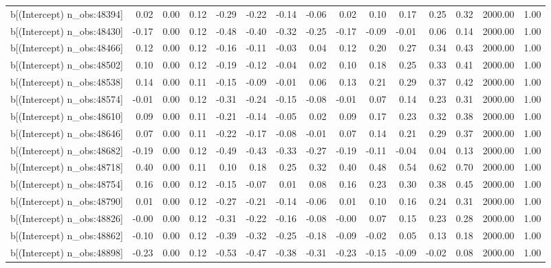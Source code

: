 \begin{table}[ht]
\begin{tabular}{rrrrrrrrrrrrrrr}
  b[(Intercept) n\_obs:48394] & 0.02 & 0.00 & 0.12 & -0.29 & -0.22 & -0.14 & -0.06 & 0.02 & 0.10 & 0.17 & 0.25 & 0.32 & 2000.00 & 1.00 \\ 
  b[(Intercept) n\_obs:48430] & -0.17 & 0.00 & 0.12 & -0.48 & -0.40 & -0.32 & -0.25 & -0.17 & -0.09 & -0.01 & 0.06 & 0.14 & 2000.00 & 1.00 \\ 
  b[(Intercept) n\_obs:48466] & 0.12 & 0.00 & 0.12 & -0.16 & -0.11 & -0.03 & 0.04 & 0.12 & 0.20 & 0.27 & 0.34 & 0.43 & 2000.00 & 1.00 \\ 
  b[(Intercept) n\_obs:48502] & 0.10 & 0.00 & 0.12 & -0.19 & -0.12 & -0.04 & 0.02 & 0.10 & 0.18 & 0.25 & 0.33 & 0.41 & 2000.00 & 1.00 \\ 
  b[(Intercept) n\_obs:48538] & 0.14 & 0.00 & 0.11 & -0.15 & -0.09 & -0.01 & 0.06 & 0.13 & 0.21 & 0.29 & 0.37 & 0.42 & 2000.00 & 1.00 \\ 
  b[(Intercept) n\_obs:48574] & -0.01 & 0.00 & 0.12 & -0.31 & -0.24 & -0.15 & -0.08 & -0.01 & 0.07 & 0.14 & 0.23 & 0.31 & 2000.00 & 1.00 \\ 
  b[(Intercept) n\_obs:48610] & 0.09 & 0.00 & 0.11 & -0.21 & -0.14 & -0.05 & 0.02 & 0.09 & 0.17 & 0.23 & 0.32 & 0.38 & 2000.00 & 1.00 \\ 
  b[(Intercept) n\_obs:48646] & 0.07 & 0.00 & 0.11 & -0.22 & -0.17 & -0.08 & -0.01 & 0.07 & 0.14 & 0.21 & 0.29 & 0.37 & 2000.00 & 1.00 \\ 
  b[(Intercept) n\_obs:48682] & -0.19 & 0.00 & 0.12 & -0.49 & -0.43 & -0.33 & -0.27 & -0.19 & -0.11 & -0.04 & 0.04 & 0.13 & 2000.00 & 1.00 \\ 
  b[(Intercept) n\_obs:48718] & 0.40 & 0.00 & 0.11 & 0.10 & 0.18 & 0.25 & 0.32 & 0.40 & 0.48 & 0.54 & 0.62 & 0.70 & 2000.00 & 1.00 \\ 
  b[(Intercept) n\_obs:48754] & 0.16 & 0.00 & 0.12 & -0.15 & -0.07 & 0.01 & 0.08 & 0.16 & 0.23 & 0.30 & 0.38 & 0.45 & 2000.00 & 1.00 \\ 
  b[(Intercept) n\_obs:48790] & 0.01 & 0.00 & 0.12 & -0.27 & -0.21 & -0.14 & -0.06 & 0.01 & 0.10 & 0.16 & 0.24 & 0.31 & 2000.00 & 1.00 \\ 
  b[(Intercept) n\_obs:48826] & -0.00 & 0.00 & 0.12 & -0.31 & -0.22 & -0.16 & -0.08 & -0.00 & 0.07 & 0.15 & 0.23 & 0.28 & 2000.00 & 1.00 \\ 
  b[(Intercept) n\_obs:48862] & -0.10 & 0.00 & 0.12 & -0.39 & -0.32 & -0.25 & -0.18 & -0.09 & -0.02 & 0.05 & 0.13 & 0.18 & 2000.00 & 1.00 \\ 
  b[(Intercept) n\_obs:48898] & -0.23 & 0.00 & 0.12 & -0.53 & -0.47 & -0.38 & -0.31 & -0.23 & -0.15 & -0.09 & -0.02 & 0.08 & 2000.00 & 1.00 \\ 

\end{tabular}
\end{table}

